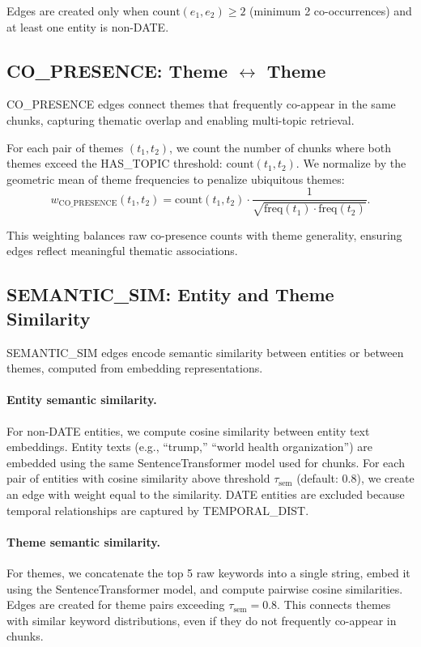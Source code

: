 \documentclass[10pt]{article}
\begin{document}
Edges are created only when $\text{count}(e_1, e_2) \ge 2$ (minimum 2 co-occurrences) and at least one entity is non-DATE.

\subsection{CO\_PRESENCE: Theme $\leftrightarrow$ Theme}

CO\_PRESENCE edges connect themes that frequently co-appear in the same chunks, capturing thematic overlap and enabling multi-topic retrieval.

For each pair of themes $(t_1, t_2)$, we count the number of chunks where both themes exceed the HAS\_TOPIC threshold: $\text{count}(t_1, t_2)$. We normalize by the geometric mean of theme frequencies to penalize ubiquitous themes:
\[
w_{\text{CO\_PRESENCE}}(t_1, t_2) = \text{count}(t_1, t_2) \cdot \frac{1}{\sqrt{\text{freq}(t_1) \cdot \text{freq}(t_2)}}.
\]

This weighting balances raw co-presence counts with theme generality, ensuring edges reflect meaningful thematic associations.

\subsection{SEMANTIC\_SIM: Entity and Theme Similarity}

SEMANTIC\_SIM edges encode semantic similarity between entities or between themes, computed from embedding representations.

\paragraph{Entity semantic similarity.} For non-DATE entities, we compute cosine similarity between entity text embeddings. Entity texts (e.g., ``trump,'' ``world health organization'') are embedded using the same SentenceTransformer model used for chunks. For each pair of entities with cosine similarity above threshold $\tau_{\text{sem}}$ (default: $0.8$), we create an edge with weight equal to the similarity. DATE entities are excluded because temporal relationships are captured by TEMPORAL\_DIST.

\paragraph{Theme semantic similarity.} For themes, we concatenate the top 5 raw
keywords into a single string, embed it using the SentenceTransformer model, and
compute pairwise cosine similarities. Edges are created for theme pairs exceeding
$\tau_{\text{sem}} = 0.8$. This connects themes with similar keyword distributions,
even if they do not frequently co-appear in chunks.
\end{document}
